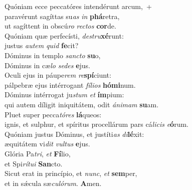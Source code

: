 \evenverse Quóniam ecce peccatóres intendérunt arcum,~+\\\evenverse  paravérunt sagíttas su\textit{as} \textit{in} \textbf{phá}retra,~\*\\
\evenverse ut sagíttent in obscú\textit{ro} \textit{re}\textit{ctos} \textbf{cor}de.\\
\oddverse Quóniam quæ perfecísti, \textit{de}\textit{stru}\textbf{xé}runt:~\*\\
\oddverse justus \textit{au}\textit{tem} \textit{quid} \textbf{fe}cit?\\
\evenverse Dóminus in templo \textit{san}\textit{cto} \textbf{su}o,~\*\\
\evenverse Dóminus in cæ\textit{lo} \textit{se}\textit{des} \textbf{e}jus.\\
\oddverse Oculi ejus in páupe\textit{rem} \textit{re}\textbf{spí}ciunt:~\*\\
\oddverse pálpebræ ejus intérrogant \textit{fí}\textit{li}\textit{os} \textbf{hó}\textbf{mi}num.\\
\evenverse Dóminus intérrogat ju\textit{stum} \textit{et} \textbf{ím}pium:~\*\\
\evenverse qui autem díligit iniquitátem, odit \textit{á}\textit{ni}\textit{mam} \textbf{su}am.\\
\oddverse Pluet super pecca\textit{tó}\textit{res} \textbf{lá}queos:~\*\\
\oddverse ignis, et sulphur, et spíritus procellárum pars cá\textit{li}\textit{cis} \textit{e}\textbf{ó}rum.\\
\evenverse Quóniam justus Dóminus, et justíti\textit{as} \textit{di}\textbf{lé}xit:~\*\\
\evenverse æquitátem vi\textit{dit} \textit{vul}\textit{tus} \textbf{e}jus.\\
\oddverse Glória Pa\textit{tri}, \textit{et} \textbf{Fí}lio,~\*\\
\oddverse et Spi\textit{rí}\textit{tu}\textit{i} \textbf{San}cto.\\
\evenverse Sicut erat in princípio, et \textit{nunc}, \textit{et} \textbf{sem}per,~\*\\
\evenverse et in sǽcula sæ\textit{cu}\textit{ló}\textit{rum}. \textbf{A}men.\\
